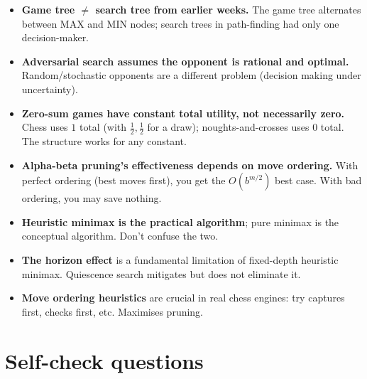 \documentclass[11pt, a4paper]{article}
\begin{document}
\begin{itemize}
  \item \textbf{Game tree $\ne$ search tree from earlier weeks.} The game tree alternates between MAX and MIN nodes; search trees in path-finding had only one decision-maker.
  \item \textbf{Adversarial search assumes the opponent is rational and optimal.} Random/stochastic opponents are a different problem (decision making under uncertainty).
  \item \textbf{Zero-sum games have constant total utility, not necessarily zero.} Chess uses $1$ total (with $\frac{1}{2}, \frac{1}{2}$ for a draw); noughts-and-crosses uses $0$ total. The structure works for any constant.
  \item \textbf{Alpha-beta pruning's effectiveness depends on move ordering.} With perfect ordering (best moves first), you get the $O(b^{m/2})$ best case. With bad ordering, you may save nothing.
  \item \textbf{Heuristic minimax is the practical algorithm}; pure minimax is the conceptual algorithm. Don't confuse the two.
  \item \textbf{The horizon effect} is a fundamental limitation of fixed-depth heuristic minimax. Quiescence search mitigates but does not eliminate it.
  \item \textbf{Move ordering heuristics} are crucial in real chess engines: try captures first, checks first, etc. Maximises pruning.
\end{itemize}

\section*{Self-check questions}
\end{document}
